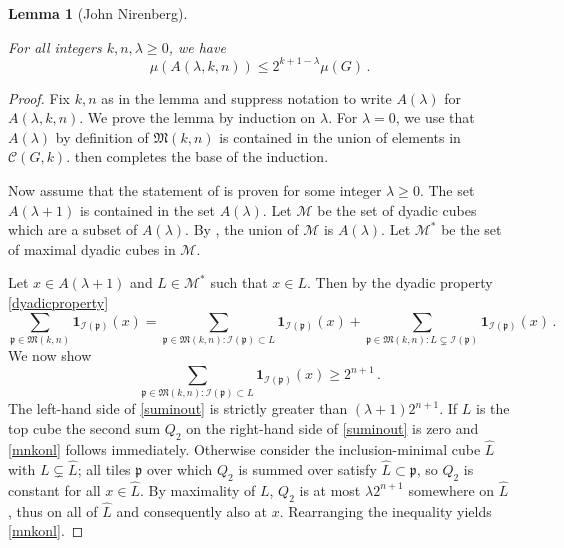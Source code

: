 \documentclass[10pt,a4paper]{article}
\theoremstyle{plain}
\newtheorem{lemma}[theorem]{Lemma}
\theoremstyle{definition}
\numberwithin{equation}{subsection}
\newcommand{\fp}{{\mathfrak p}}
\newcommand{\scI}{{\mathcal{I}}} %
\newcommand{\lean}[1]{}
\newcommand{\uses}[1]{}
\newcommand{\leanok}{}
\begin{document}
\begin{lemma}[John Nirenberg]
\label{John-Nirenberg}
\leanok
\lean{john_nirenberg}
\uses{dense-cover, pairwise-disjoint, dyadic-union}
    For all integers $k,n,\lambda\ge 0$, we have
    \begin{equation}\label{alambdameasure}
        \mu(A(\lambda,k,n)) \le 2^{k+1-\lambda}\mu(G)\,.
    \end{equation}

\end{lemma}
\begin{proof}
\leanok
Fix $k,n$ as in the lemma
and suppress notation to write
$A(\lambda)$ for $A(\lambda,k,n)$.
We prove the lemma by induction on $\lambda$.
For $\lambda=0$, we use that $A(\lambda)$ by definition of $\mathfrak{M}(k,n)$ is contained in the union of elements in $ \mathcal{C}(G,k)$.  then completes the base of the induction.

Now assume that the statement of 
is proven for some integer $\lambda\ge 0$.
The set $A(\lambda+1)$ is contained in the set $A(\lambda)$.
Let $\mathcal{M}$ be the set of dyadic cubes which are a subset of $A(\lambda)$. By , the union of $\mathcal{M}$ is $A(\lambda)$.
Let $\mathcal{M}^*$ be the set of maximal dyadic cubes in $\mathcal{M}$.

Let $x\in A(\lambda+1)$ and $L\in \mathcal{M}^*$ such that $x\in L$. Then by the dyadic property \eqref{dyadicproperty}
\begin{equation}\label{suminout}
    \sum_{\fp \in {\mathfrak{M}}(k,n)} \mathbf{1}_{\scI(\fp)}(x) =
    \sum_{\fp \in {\mathfrak{M}}(k,n):\scI(\fp) \subset L} \mathbf{1}_{\scI(\fp)}(x) +
    \sum_{\fp \in {\mathfrak{M}}(k,n):L \subsetneq \scI(\fp)} \mathbf{1}_{\scI(\fp)}(x)\,.
\end{equation}
We now show
\begin{equation}\label{mnkonl}
    \sum_{\fp \in {\mathfrak{M}}(k,n):\scI(\fp) \subset L} \mathbf{1}_{\scI(\fp)}(x)\ge 2^{n+1}\,.
\end{equation}
The left-hand side of \eqref{suminout} is strictly greater than $(\lambda+1)2^{n+1}$.
If $L$ is the top cube the second sum $Q_2$ on the right-hand side of \eqref{suminout} is zero and
\eqref{mnkonl} follows immediately. Otherwise consider the inclusion-minimal cube $\hat{L}$ with $L\subsetneq\hat{L}$;
all tiles $\fp$ over which $Q_2$ is summed over satisfy $\hat{L}\subset\fp$, so $Q_2$ is constant for all $x\in\hat{L}$.
By maximality of $L$, $Q_2$ is at most $\lambda 2^{n+1}$ somewhere on $\hat{L}$,
thus on all of $\hat{L}$ and consequently also at $x$. Rearranging the inequality yields \eqref{mnkonl}.


\end{proof}
\end{document}
